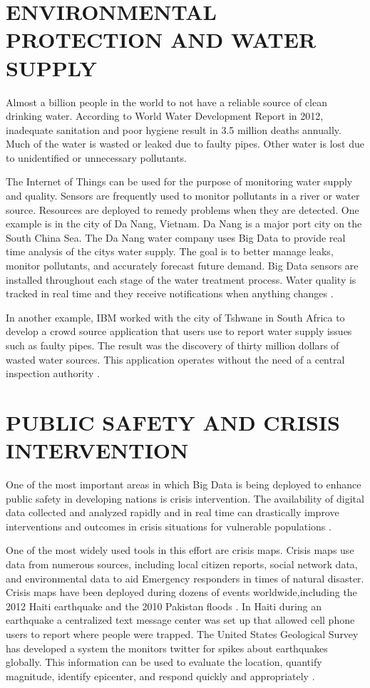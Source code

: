 \documentclass[sigconf]{acmart}
\begin{document}
\section{ENVIRONMENTAL PROTECTION AND WATER SUPPLY}

Almost a billion people in the world to not have a reliable source of clean drinking water. According to World Water Development Report in 2012, inadequate sanitation and poor hygiene result in 3.5 million deaths annually. Much of the water is wasted or leaked due to faulty pipes. Other water is lost due to unidentified or unnecessary pollutants.

The Internet of Things can be used for the purpose of monitoring water supply and quality. Sensors are frequently used to monitor pollutants in a river or water source. Resources are deployed to remedy problems when they are detected.  One example is in the city of Da Nang, Vietnam. Da Nang is a major port city on the South China Sea. The Da Nang water company uses Big Data to provide real time analysis of the citys water supply. The goal is to better manage leaks, monitor pollutants, and accurately forecast future demand. Big Data sensors are installed throughout each stage of the water treatment process. Water quality is tracked in real time and they receive notifications when anything changes \cite{DevEcon}.

In another example, IBM worked with the city of Tshwane in South Africa to develop a crowd source application that users use to report water supply issues such as faulty pipes. The result was the discovery of thirty million dollars of wasted water sources. This application operates without the need of a central inspection authority \cite{www-google-Hffpst}.

\section{PUBLIC SAFETY AND CRISIS INTERVENTION}

One of the most important areas in which Big Data is being deployed to enhance public safety in developing nations is crisis intervention. The availability of digital data collected and analyzed rapidly and in real time can drastically improve interventions and outcomes in crisis situations for vulnerable populations \cite{www-google-GloPls}.  

One of the most widely used tools in this effort are crisis maps. Crisis maps use data from numerous sources, including local citizen reports, social network data, and environmental data to aid Emergency responders in times of natural disaster. Crisis maps have been deployed during dozens of events worldwide,including the 2012 Haiti earthquake and the 2010 Pakistan floods \cite{www-google-Hffpst}.
In Haiti during an earthquake a centralized text message center was set up that allowed cell phone users to report where people were trapped. The United States Geological Survey has developed a system the monitors twitter for spikes about earthquakes globally. This information can be used to evaluate the location, quantify magnitude, identify epicenter, and respond quickly and appropriately \cite{www-google-GloPls}.
\end{document}
